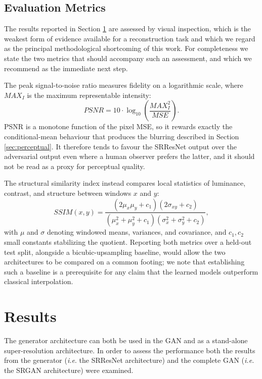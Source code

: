 \documentclass[conference]{IEEEtran}
\begin{document}
\subsection{Evaluation Metrics}
\label{sec:metrics}
The results reported in Section \ref{sec:results} are assessed by visual inspection, which is the weakest form of evidence available for a reconstruction task and which we regard as the principal methodological shortcoming of this work. For completeness we state the two metrics that should accompany such an assessment, and which we recommend as the immediate next step.

The peak signal-to-noise ratio measures fidelity on a logarithmic scale, where $MAX_I$ is the maximum representable intensity:
\begin{equation}
PSNR = 10 \cdot \log_{10}\!\left(\frac{MAX_I^2}{MSE}\right).
\label{eq:psnr}
\end{equation}
PSNR is a monotone function of the pixel MSE, so it rewards exactly the conditional-mean behaviour that produces the blurring described in Section \ref{sec:perceptual}. It therefore tends to favour the SRResNet output over the adversarial output even where a human observer prefers the latter, and it should not be read as a proxy for perceptual quality.

The structural similarity index instead compares local statistics of luminance, contrast, and structure between windows $x$ and $y$:
\begin{equation}
SSIM(x,y) = \frac{(2\mu_x\mu_y + c_1)(2\sigma_{xy} + c_2)}{(\mu_x^2 + \mu_y^2 + c_1)(\sigma_x^2 + \sigma_y^2 + c_2)},
\label{eq:ssim}
\end{equation}
with $\mu$ and $\sigma$ denoting windowed means, variances, and covariance, and $c_1, c_2$ small constants stabilizing the quotient. Reporting both metrics over a held-out test split, alongside a bicubic-upsampling baseline, would allow the two architectures to be compared on a common footing; we note that establishing such a baseline is a prerequisite for any claim that the learned models outperform classical interpolation.

\section{Results}
\label{sec:results}

The generator architecture can both be used in the GAN and as a stand-alone super-resolution architecture. In order to assess the performance both the results from the generator (\textit{i.e}. the SRResNet architecture) and the complete GAN (\textit{i.e.} the SRGAN architecture) were examined. 
\end{document}
